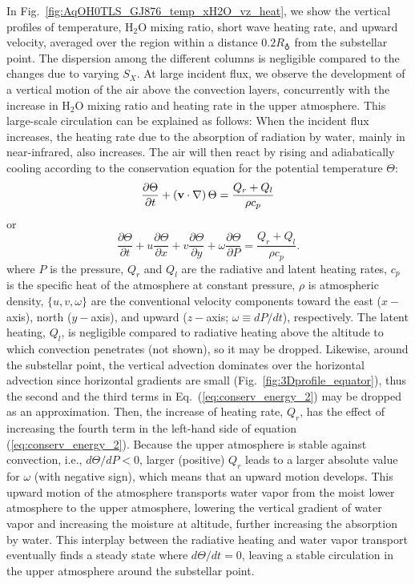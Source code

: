\documentclass[11pt,numberedappendix,twocolappendix,]{emulateapj}
\def\water{H$_2$O }
\begin{document}
In Fig.~\ref{fig:AqOH0TLS_GJ876_temp_xH2O_vz_heat}, we show the vertical profiles of temperature, \water mixing ratio, short wave heating rate, and upward velocity, averaged over the region within a distance $0.2R_\earth$ from the substellar point. 
The dispersion among the different columns is negligible compared to the changes due to varying $S_X$. 
At large incident flux, we observe the development of a vertical motion of the air above the convection layers, concurrently with the increase in \water mixing ratio and heating rate in the upper atmosphere. 
This large-scale circulation can be explained as follows: When the incident flux increases, the heating rate due to the absorption of radiation by water, mainly in near-infrared, also increases. 
The air will then react by rising and adiabatically cooling according to the conservation equation for the potential temperature $\Theta $:
\begin{equation}
\frac{\partial \Theta }{\partial t} + ( {\bf v} \cdot \nabla ) \, \Theta = \frac{ Q_r + Q_l }{\rho c_p} \label{eq:conserv_energy}
\end{equation}
or
\begin{equation}
\frac{\partial \Theta }{\partial t} + u \frac{\partial \Theta }{\partial x} + v\frac{\partial \Theta }{\partial y} + \omega \frac{\partial \Theta }{\partial P} = \frac{ Q_r + Q_l }{\rho c_p}. \label{eq:conserv_energy_2}
\end{equation}
where $P$ is the pressure, $Q_r$ and $Q_l$ are the radiative and latent heating rates, $c_p$ is the specific heat of the atmosphere at constant pressure, $\rho $ is atmospheric density, $\{ u, v, \omega \}$ are the conventional velocity components toward the east ($x-$axis), north ($y-$axis), and upward ($z-$axis; $\omega \equiv dP/dt$), respectively. 
The latent heating, $Q_l$, is negligible compared to radiative heating above the altitude to which convection penetrates (not shown), so it may be dropped. 
Likewise, around the substellar point, the vertical advection dominates over the horizontal advection since horizontal gradients are small (Fig.~\ref{fig:3Dprofile_equator}), thus the second and the third terms in Eq.~(\ref{eq:conserv_energy_2}) may be dropped as an approximation. 
Then, the increase of heating rate, $Q_r$, has the effect of increasing the fourth term in the left-hand side of equation (\ref{eq:conserv_energy_2}). 
Because the upper atmosphere is stable against convection, i.e., $d \Theta / d P < 0 $, larger (positive) $Q_r$ leads to a larger absolute value for $\omega $ (with negative sign), which means that an upward motion develops. 
This upward motion of the atmosphere transports water vapor from the moist lower atmosphere to the upper atmosphere, lowering the vertical gradient of water vapor and increasing the moisture at altitude, further increasing the absorption by water. 
This interplay between the radiative heating and water vapor transport eventually finds a steady state where $d\Theta/dt = 0$, leaving a stable circulation in the upper atmosphere around the substellar point. 
\end{document}
